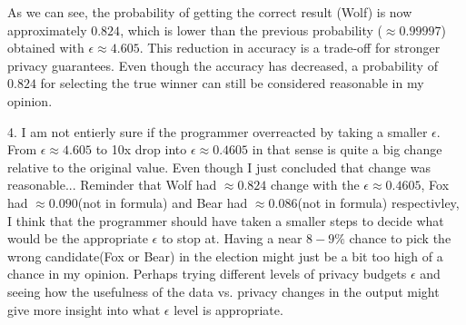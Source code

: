 As we can see, the probability of getting the correct result (Wolf) is now approximately $0.824$,
which is lower than the previous probability ($\approx 0.99997$) obtained
with $\epsilon \approx 4.605$.
This reduction in accuracy is a trade-off for stronger privacy guarantees.
Even though the accuracy has decreased, a probability of $0.824$ for selecting
the true winner can still be considered reasonable in my opinion.

4. I am not entierly sure if the programmer overreacted by taking a smaller $\epsilon$.
From $\epsilon \approx 4.605$ to 10x drop into $\epsilon \approx 0.4605$ in that sense is quite a big change relative to the original value.
Even though I just concluded that change was reasonable... Reminder that Wolf had $\approx 0.824$ change with the $\epsilon \approx 0.4605$,
Fox had $\approx 0.090$(not in formula) and Bear had $\approx 0.086$(not in formula) respectivley, I think
that the
programmer should
have taken a
smaller steps
to
decide what would
be the appropriate $\epsilon$ to stop at. Having a near $8-9\%$ chance to pick the wrong candidate(Fox or Bear) in the election might just
be a
bit
too
high of a chance in my opinion. Perhaps trying different levels of privacy budgets $\epsilon$ and seeing how the
usefulness of the data vs. privacy changes in the output might give more insight into what $\epsilon$ level is appropriate.
